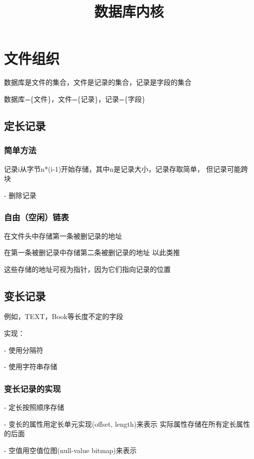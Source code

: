 \documentclass{article}        %
\begin{document}
 
\title{数据库内核}

\section{文件组织}

数据库是文件的集合，文件是记录的集合，记录是字段的集合 

数据库=\{文件\}，文件=\{记录\}，记录=\{字段\}

\subsection{定长记录}

\subsubsection{简单方法} 

记录i从字节n*(i-1)开始存储，其中n是记录大小，记录存取简单，
但记录可能跨块

- 删除记录 

\subsubsection{自由（空闲）链表}

在文件头中存储第一条被删记录的地址 

在第一条被删记录中存储第二条被删记录的地址 以此类推

这些存储的地址可视为指针，因为它们指向记录的位置 

\subsection{变长记录}

例如，TEXT，Book等长度不定的字段

实现：

- 使用分隔符

- 使用字符串存储

\subsubsection{变长记录的实现}

- 定长按照顺序存储

- 变长的属性用定长单元实现(offset, length)来表示 
实际属性存储在所有定长属性的后面

- 空值用空值位图(null-value bitmap)来表示 
\end{document}
